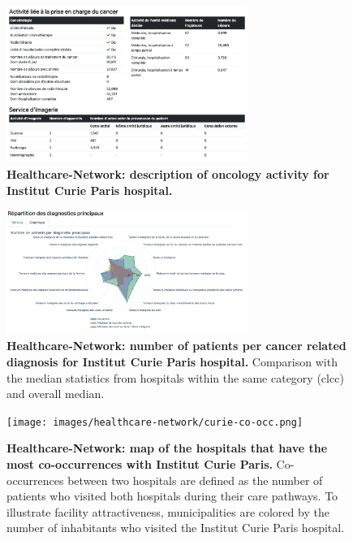 \begin{figure}[H]
    \includegraphics[width=0.7\textwidth]{images/healthcare-network/curie-cancero.png}
    \centering
    \caption{
        \textbf{Healthcare-Network: description of oncology activity for Institut Curie Paris hospital.}
    }
    \label{fig:hn-curie-cancero}
\end{figure}


\begin{figure}[H]
    \includegraphics[width=0.7\textwidth]{images/healthcare-network/curie-dp.png}
    \centering
    \caption{
        \textbf{Healthcare-Network: number of patients per cancer related diagnosis for Institut Curie Paris hospital.} Comparison with the median statistics from hospitals within the same category (\ac{clcc}) and overall median.
    }
    \label{fig:hn-curie-dp}
\end{figure}


\begin{figure}[H]
    \texttt{[image: images/healthcare-network/curie-co-occ.png]}
    \centering
    \caption{
        \textbf{Healthcare-Network: map of the hospitals that have the most co-occurrences with Institut Curie Paris.} Co-occurrences between two hospitals are defined as the number of patients who visited both hospitals during their care pathways. To illustrate facility attractiveness, municipalities are colored by the number of inhabitants who visited the Institut Curie Paris hospital.
    }
    \label{fig:hn-curie-co-occ}
\end{figure}

